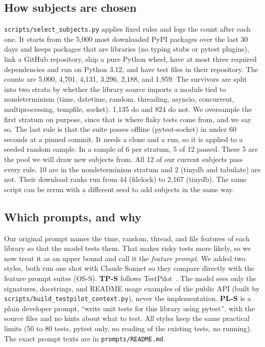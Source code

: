 \documentclass[sigconf,nonacm]{acmart}
\begin{document}
\subsection{How subjects are chosen}
\label{sec:subjects}
\texttt{scripts/select\_subjects.py} applies fixed rules and logs the count after each one. It starts from the 5,000 most downloaded PyPI packages over the last 30 days and keeps packages that are libraries (no typing stubs or pytest plugins), link a GitHub repository, ship a pure Python wheel, have at most three required dependencies and run on Python 3.12, and have test files in their repository. The counts are 5,000, 4,701, 4,131, 3,296, 2,188, and 1,959. The survivors are split into two strata by whether the library source imports a module tied to nondeterminism (time, datetime, random, threading, asyncio, concurrent, multiprocessing, tempfile, socket). 1,135 do and 824 do not. We oversample the first stratum on purpose, since that is where flaky tests come from, and we say so. The last rule is that the suite passes offline (pytest-socket) in under 60 seconds at a pinned commit. It needs a clone and a run, so it is applied to a seeded random sample. In a sample of 6 per stratum, 5 of 12 passed. These 5 are the pool we will draw new subjects from. All 12 of our current subjects pass every rule. 10 are in the nondeterminism stratum and 2 (tinydb and tabulate) are not. Their download ranks run from 44 (filelock) to 2,167 (tinydb). The same script can be rerun with a different seed to add subjects in the same way.

\subsection{Which prompts, and why}
Our original prompt names the time, random, thread, and file features of each library so that the model tests them. That makes risky tests more likely, so we now treat it as an upper bound and call it the \emph{feature prompt}. We added two styles, both run one shot with Claude Sonnet so they compare directly with the feature prompt suites (OS-S). \textbf{TP-S} follows TestPilot~\cite{schafer2024}. The model sees only the signatures, docstrings, and README usage examples of the public API (built by \texttt{scripts/build\_testpilot\_context.py}), never the implementation. \textbf{PL-S} is a plain developer prompt, ``write unit tests for this library using pytest'', with the source files and no hints about what to test. All styles keep the same practical limits (50 to 80 tests, pytest only, no reading of the existing tests, no running). The exact prompt texts are in \texttt{prompts/README.md}.
\end{document}
